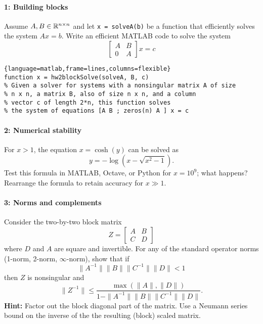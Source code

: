 \documentclass[12pt, leqno]{article}
\begin{document}

\paragraph{1: Building blocks}
Assume $A, B \in \mathbb{R}^{n \times n}$ and let {\tt x = solveA(b)} be a function
that efficiently solves the system $Ax = b$.
Write an efficient MATLAB code to solve the system
\[
  \begin{bmatrix} A & B \\ 0 & A \end{bmatrix} x = c
\]

\begin{lstlisting}{language=matlab,frame=lines,columns=flexible}
function x = hw2blockSolve(solveA, B, c)
% Given a solver for systems with a nonsingular matrix A of size
% n x n, a matrix B, also of size n x n, and a column
% vector c of length 2*n, this function solves 
% the system of equations [A B ; zeros(n) A ] x = c
\end{lstlisting}

\paragraph*{2: Numerical stability}
For $x > 1$, the equation $x = \cosh(y)$ can be solved as
\[
  y = -\log\left( x-\sqrt{x^2-1} \right).
\]
Test this formula in MATLAB, Octave, or Python for $x = 10^9$; what
happens?  Rearrange the formula to retain accuracy for $x \gg 1$.

\paragraph*{3: Norms and complements}
Consider the two-by-two block matrix
\[
Z = \begin{bmatrix} A & B \\ C & D \end{bmatrix}
\]
where $D$ and $A$ are square and invertible.  For any of the standard
operator norms (1-norm, 2-norm, $\infty$-norm), show that if
\[
  \|A^{-1}\| \|B\| \|C^{-1}\| \|D\| < 1
\]
then $Z$ is nonsingular and
\[
  \|Z^{-1}\| \leq \frac{\max(\|A\|, \|D\|)}{1-\|A^{-1}\|\|B\|\|C^{-1}\|\|D\|}.
\]
{\bf Hint:} Factor out the block diagonal part of the matrix.
Use a Neumann series bound on the inverse of the
the resulting (block) scaled matrix.
\end{document}
